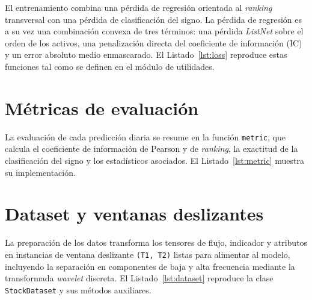 El entrenamiento combina una pérdida de regresión orientada al \emph{ranking}
transversal con una pérdida de clasificación del signo. La pérdida de regresión es a
su vez una combinación convexa de tres términos: una pérdida \emph{ListNet} sobre el
orden de los activos, una penalización directa del coeficiente de información (IC) y
un error absoluto medio enmascarado. El Listado~\ref{lst:loss} reproduce estas
funciones tal como se definen en el módulo de utilidades.



\section{Métricas de evaluación}\label{sec:cod-metric}

La evaluación de cada predicción diaria se resume en la función \texttt{metric}, que
calcula el coeficiente de información de Pearson y de \emph{ranking}, la exactitud de
la clasificación del signo y los estadísticos asociados. El Listado~\ref{lst:metric}
muestra su implementación.



\section{Dataset y ventanas deslizantes}\label{sec:cod-dataset}

La preparación de los datos transforma los tensores de flujo, indicador y atributos en
instancias de ventana deslizante \texttt{(T1, T2)} listas para alimentar al modelo,
incluyendo la separación en componentes de baja y alta frecuencia mediante la
transformada \emph{wavelet} discreta. El Listado~\ref{lst:dataset} reproduce la clase
\texttt{StockDataset} y sus métodos auxiliares.



